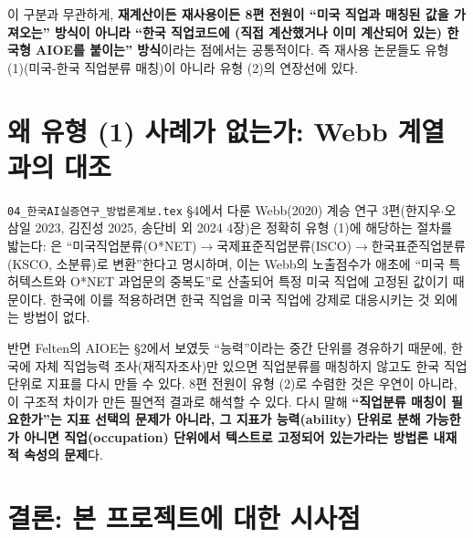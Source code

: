 \documentclass[11pt]{article}
\begin{document}
이 구분과 무관하게, \textbf{재계산이든 재사용이든 8편 전원이 ``미국 직업과 매칭된 값을 가져오는'' 방식이 아니라 ``한국 직업코드에 (직접 계산했거나 이미 계산되어 있는) 한국형 AIOE를 붙이는'' 방식}이라는 점에서는 공통적이다. 즉 재사용 논문들도 유형 (1)(미국-한국 직업분류 매칭)이 아니라 유형 (2)의 연장선에 있다.

\section{왜 유형 (1) 사례가 없는가: Webb 계열과의 대조}\label{sec:contrast}

\texttt{04\_한국AI실증연구\_방법론계보.tex} \S4에서 다룬 Webb(2020) 계승 연구 3편(한지우$\cdot$오삼일 2023, 김진성 2025, 송단비 외 2024 4장)은 정확히 유형 (1)에 해당하는 절차를 밟는다: \citet{han-2023-ai-and-labor-market-change}은 ``미국직업분류(O*NET)$\to$국제표준직업분류(ISCO)$\to$한국표준직업분류(KSCO, 소분류)로 변환''한다고 명시하며, 이는 Webb의 노출점수가 애초에 ``미국 특허텍스트와 O*NET 과업문의 중복도''로 산출되어 특정 미국 직업에 고정된 값이기 때문이다. 한국에 이를 적용하려면 한국 직업을 미국 직업에 강제로 대응시키는 것 외에는 방법이 없다.

반면 Felten의 AIOE는 \S2에서 보였듯 ``능력''이라는 중간 단위를 경유하기 때문에, 한국에 자체 직업능력 조사(재직자조사)만 있으면 직업분류를 매칭하지 않고도 한국 직업 단위로 지표를 다시 만들 수 있다. 8편 전원이 유형 (2)로 수렴한 것은 우연이 아니라, 이 구조적 차이가 만든 필연적 결과로 해석할 수 있다. 다시 말해 \textbf{``직업분류 매칭이 필요한가''는 지표 선택의 문제가 아니라, 그 지표가 능력(ability) 단위로 분해 가능한가 아니면 직업(occupation) 단위에서 텍스트로 고정되어 있는가라는 방법론 내재적 속성의 문제}다.

\section{결론: 본 프로젝트에 대한 시사점}
\end{document}
